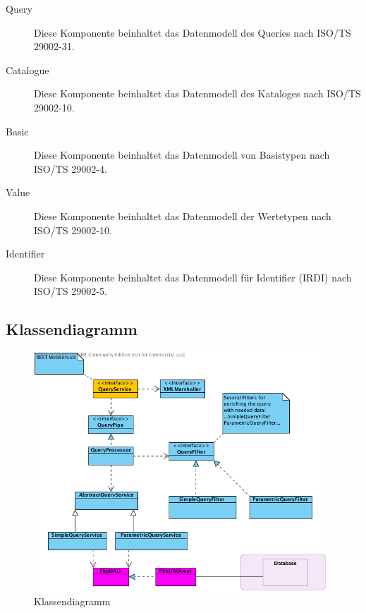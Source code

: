 \begin{description}
\item[Query] Diese Komponente beinhaltet das Datenmodell des Queries nach ISO/TS 29002-31. 
\item[Catalogue] Diese Komponente beinhaltet das Datenmodell des Kataloges nach ISO/TS 29002-10. 
\item[Basic] Diese Komponente beinhaltet das Datenmodell von Basistypen nach ISO/TS 29002-4.
\item[Value] Diese Komponente beinhaltet das Datenmodell der Wertetypen nach ISO/TS 29002-10.
\item[Identifier] Diese Komponente beinhaltet das Datenmodell für Identifier (IRDI) nach ISO/TS 29002-5. 
\end{description}

\subsection{Klassendiagramm}

\begin{figure}[htbp]
	\centering
		\includegraphics[width=0.98\textwidth]{images/klassendiagramm_plib.png}
	\caption{Klassendiagramm}
	\label{fig:klassendiagramm}
\end{figure}
